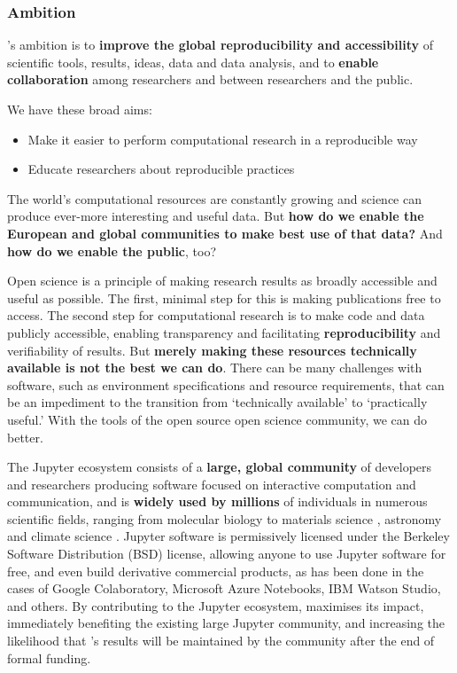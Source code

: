 
\subsubsection{Ambition}

\TheProject's ambition is to \textbf{improve the global reproducibility and accessibility} of scientific
tools, results, ideas, data and data analysis, and to 
\textbf{enable collaboration} among researchers and between researchers and the public.

We have these broad aims:
\begin{itemize}
\item Make it easier to perform computational research in a reproducible way
\item Educate researchers about reproducible practices
\end{itemize}

The world's computational resources are
constantly growing and science can produce ever-more interesting and useful 
data.  But \textbf{how do we enable the European and global
communities to make best use of that data?}  And \textbf{how do we enable the
public}, too?

Open science is a principle of making research
results as broadly accessible and useful as possible.  The first,
minimal step for this is making publications free to access.  The
second step for computational research is to make code and data
publicly accessible, enabling transparency and facilitating
\textbf{reproducibility} and verifiability of results.  But \textbf{merely making these
resources technically available is not the best we can do}.  There can
be many challenges with software, such as environment specifications
and resource requirements, that can be an impediment to the transition
from `technically available' to `practically useful.'  With the tools
of the open source open science community, we can do better.


The Jupyter ecosystem consists of a \textbf{large, global community} of
developers and researchers producing software focused on interactive
computation and communication, and is \textbf{widely used by millions} of
individuals in numerous scientific fields, ranging from molecular
biology \cite{Wang2016} to materials science \cite{Hughes2014},
astronomy \cite{Baron2017} and climate science
\cite{Laken2015,Laken2015b}.  Jupyter software is permissively
licensed under the Berkeley Software Distribution (BSD) license,
allowing anyone to use Jupyter software for free, and even build
derivative commercial products, as has been done in the cases of
Google Colaboratory, Microsoft Azure Notebooks, IBM Watson Studio, and
others.  By contributing to the Jupyter ecosystem,
\TheProject maximises its impact, immediately benefiting the existing
large Jupyter community, and increasing the likelihood that
\TheProject's results will be maintained by the community after the
end of formal funding.

